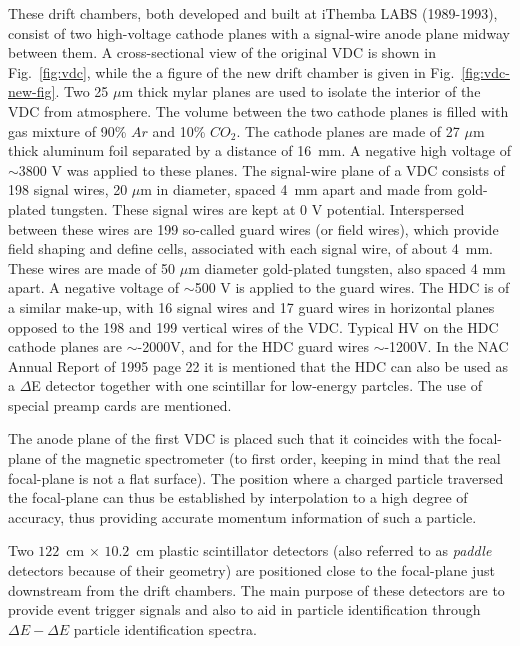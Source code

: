 \documentclass[11pt]{report}
\begin{document}
These drift chambers, both developed and built at iThemba LABS (1989-1993), 
consist of two high-voltage cathode planes with a signal-wire
anode plane midway between them.
A cross-sectional view of the original VDC is shown in Fig.~\ref{fig:vdc}, while the
a figure of the new drift chamber is given in Fig.~\ref{fig:vdc-new-fig}.
Two 25 $\mu$m thick mylar planes are used to isolate the interior 
of the VDC from atmosphere. The volume between the two cathode planes is
filled with gas mixture of 90\% $Ar$ and 10\% $CO_{2}$.
The cathode planes are made of 27 $%
\mu $m thick aluminum foil separated by a distance of 16~mm. A
negative high voltage of $\sim$3800 V was applied to these planes. 
The signal-wire plane of a VDC consists of 198 signal
wires, 20 $\mu $m in diameter, spaced 4~mm apart and made from gold-plated
tungsten. These signal wires are kept at 0 V potential. Interspersed between
these wires are 199 so-called guard wires (or field wires), which provide field shaping
and define cells, associated with each signal wire, of about 4~mm.
These wires are made of 50 $\mu $m diameter gold-plated tungsten, also spaced 4
mm apart. A negative voltage of $\sim$500 V is applied to the guard wires.
The HDC is of a similar make-up, with 16 signal wires and 17 guard
wires in horizontal planes opposed to the 198 and 199 vertical wires 
of the VDC. Typical HV on the HDC cathode planes are $\sim$-2000V, and 
for the HDC guard wires $\sim$-1200V. In the NAC Annual Report of 1995 page 22 it is
mentioned that the HDC can also be used as a $\Delta$E detector together with one
scintillar for low-energy partcles. The use of special preamp cards are mentioned.

The anode plane of the first VDC is placed such 
that it coincides with the focal-plane of the magnetic spectrometer (to first 
order, keeping in mind that the real focal-plane is not a flat surface).
The position where a charged particle traversed the focal-plane can thus
be established by interpolation to a high degree of accuracy,
thus providing accurate momentum information of such a particle.

Two $122$~cm $\times$ $10.2$~cm  plastic scintillator detectors 
(also referred to as \textit{paddle} detectors because of their geometry)
are positioned close to the focal-plane just downstream from the drift chambers. 
The main purpose of these detectors are to provide event 
trigger signals and also to aid in particle identification
through $\Delta E-\Delta E$ particle identification spectra.
\end{document}
